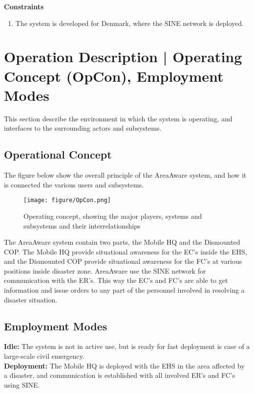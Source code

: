 \noindent \textbf{Constraints}
\begin{enumerate}
	\item The system is developed for Denmark, where the SINE network is deployed.
\end{enumerate}

\section{Operation Description | Operating Concept (OpCon), Employment Modes}

This section describe the environment in which the system is operating, and interfaces to the surrounding actors and subsystems.

\subsection{Operational Concept}
The figure below show the overall principle of the AreaAware system, and how it is connected the various users and subsystems.

\begin{figure}[ht]
	\centering
	\texttt{[image: figure/OpCon.png]}
	\caption{Operating concept, showing the major players, systems and subsystems and their interrelationships}
	\label{fig:OpCon}
\end{figure}

\FloatBarrier

\noindent The AreaAware system contain two parts, the Mobile HQ and the Dismounted COP. The Mobile HQ provide situational awareness for the EC's inside the EHS, and the Dismounted COP provide situational awareness for the FC's at various positions inside disaster zone. AreaAware use the SINE network for communication with the ER's. This way the EC's and FC's are able to get information and issue orders to any part of the personnel involved in resolving a disaster situation.

\subsection{Employment Modes}
\textbf{Idle:} The system is not in active use, but is ready for fast deployment is case of a large-scale civil emergency.\\

\noindent \textbf{Deployment:} The Mobile HQ is deployed with the EHS in the area affected by a disaster, and communication is established with all involved ER's and FC's using SINE.\\
 
